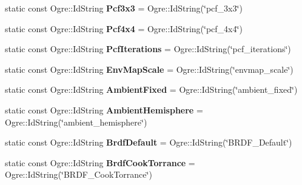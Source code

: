 \begin{DoxyCompactItemize}
\item 
\mbox{\label{struct_terrain_property_a89f0b09e8c25338b07c18b6cbdde79d3}} 
static const Ogre\+::\+Id\+String {\bfseries Pcf3x3} = Ogre\+::\+Id\+String(\char`\"{}pcf\+\_\+3x3\char`\"{})
\item 
\mbox{\label{struct_terrain_property_a9cb2afcb4970a29cdce9467cf8924079}} 
static const Ogre\+::\+Id\+String {\bfseries Pcf4x4} = Ogre\+::\+Id\+String(\char`\"{}pcf\+\_\+4x4\char`\"{})
\item 
\mbox{\label{struct_terrain_property_a0b0db17f3711b9133dd51d1d004fc3fa}} 
static const Ogre\+::\+Id\+String {\bfseries Pcf\+Iterations} = Ogre\+::\+Id\+String(\char`\"{}pcf\+\_\+iterations\char`\"{})
\item 
\mbox{\label{struct_terrain_property_ac6065b41bb892cb13bcdc97a7e421856}} 
static const Ogre\+::\+Id\+String {\bfseries Env\+Map\+Scale} = Ogre\+::\+Id\+String(\char`\"{}envmap\+\_\+scale\char`\"{})
\item 
\mbox{\label{struct_terrain_property_af28e06830806f5eacffd56d180aae06f}} 
static const Ogre\+::\+Id\+String {\bfseries Ambient\+Fixed} = Ogre\+::\+Id\+String(\char`\"{}ambient\+\_\+fixed\char`\"{})
\item 
\mbox{\label{struct_terrain_property_a4958d05abfac1cb149b7908f203bc807}} 
static const Ogre\+::\+Id\+String {\bfseries Ambient\+Hemisphere} = Ogre\+::\+Id\+String(\char`\"{}ambient\+\_\+hemisphere\char`\"{})
\item 
\mbox{\label{struct_terrain_property_a300b3f59540f0f9e19fc5b54b89513dc}} 
static const Ogre\+::\+Id\+String {\bfseries Brdf\+Default} = Ogre\+::\+Id\+String(\char`\"{}B\+R\+D\+F\+\_\+\+Default\char`\"{})
\item 
\mbox{\label{struct_terrain_property_aa8fc06beb53007f23df7c61d973fdfc1}} 
static const Ogre\+::\+Id\+String {\bfseries Brdf\+Cook\+Torrance} = Ogre\+::\+Id\+String(\char`\"{}B\+R\+D\+F\+\_\+\+Cook\+Torrance\char`\"{})
\item 
\mbox{\label{struct_terrain_property_a47eef3266703c4b57e7a41d5c31af4bb}} 

\end{DoxyCompactItemize}
